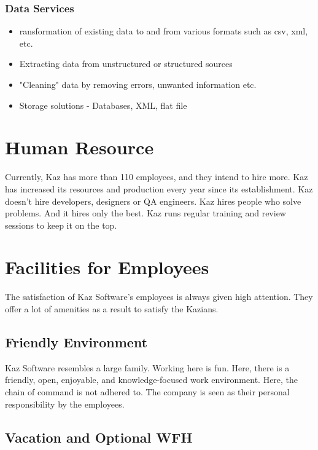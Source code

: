 \subsubsection*{Data Services}

\begin{itemize}
    \item ransformation of existing data to and from various formats such as csv, xml, etc.
    \item Extracting data from unstructured or structured sources
    \item "Cleaning" data by removing errors, unwanted information etc.
    \item Storage solutions - Databases, XML, flat file
\end{itemize}

\section{Human Resource}

Currently, Kaz has more than 110 employees, and they intend to hire more.
Kaz has increased its resources and production every year since its establishment.
Kaz doesn't hire developers, designers or QA engineers.
Kaz hires people who solve problems.
And it hires only the best.
Kaz runs regular training and review sessions to keep it on the top.

\section{Facilities for Employees}

The satisfaction of Kaz Software's employees is always given high attention.
They offer a lot of amenities as a result to satisfy the Kazians.

\subsection{Friendly Environment}

Kaz Software resembles a large family.
Working here is fun.
Here, there is a friendly, open, enjoyable, and knowledge-focused work environment.
Here, the chain of command is not adhered to.
The company is seen as their personal responsibility by the employees.

\subsection{Vacation and Optional WFH}

